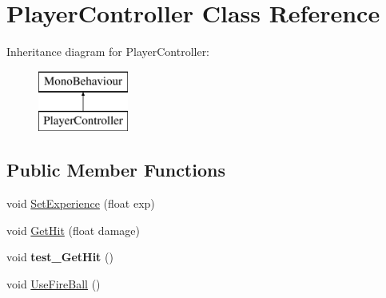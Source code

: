 \hypertarget{class_player_controller}{}\section{Player\+Controller Class Reference}
\label{class_player_controller}
Inheritance diagram for Player\+Controller\+:\begin{figure}[H]
\begin{center}
\leavevmode
\includegraphics[height=2.000000cm]{class_player_controller}
\end{center}
\end{figure}
\subsection*{Public Member Functions}
\begin{DoxyCompactItemize}
\item 
void \hyperlink{class_player_controller_a14434c4f065a70cceb5534243df61b2b}{Set\+Experience} (float exp)
\item 
void \hyperlink{class_player_controller_a73a0a3a2d932a17798ab34abd7e885f4}{Get\+Hit} (float damage)
\item 
\mbox{\label{class_player_controller_af91f8bb70965e0c19065950f7cbc6c88}} 
void {\bfseries test\+\_\+\+Get\+Hit} ()
\item 
void \hyperlink{class_player_controller_af07c0c336328fe5b77c783e49d523bf6}{Use\+Fire\+Ball} ()
\end{DoxyCompactItemize}
